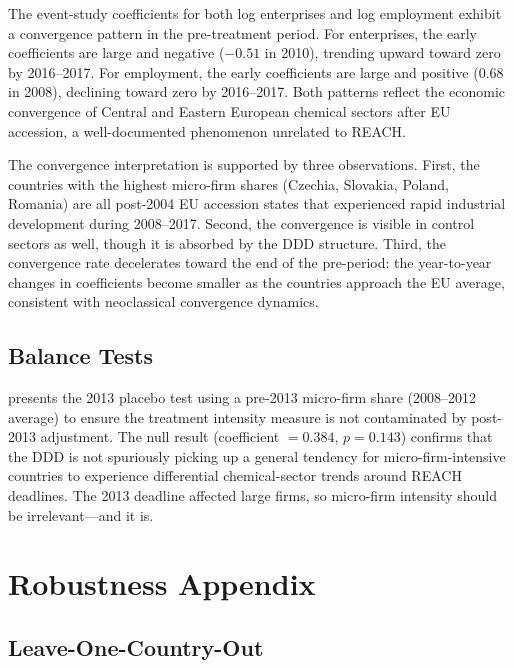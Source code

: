 \documentclass[12pt]{article}
\begin{document}
The event-study coefficients for both log enterprises and log employment exhibit a convergence pattern in the pre-treatment period. For enterprises, the early coefficients are large and negative ($-0.51$ in 2010), trending upward toward zero by 2016--2017. For employment, the early coefficients are large and positive ($0.68$ in 2008), declining toward zero by 2016--2017. Both patterns reflect the economic convergence of Central and Eastern European chemical sectors after EU accession, a well-documented phenomenon unrelated to REACH.

The convergence interpretation is supported by three observations. First, the countries with the highest micro-firm shares (Czechia, Slovakia, Poland, Romania) are all post-2004 EU accession states that experienced rapid industrial development during 2008--2017. Second, the convergence is visible in control sectors as well, though it is absorbed by the DDD structure. Third, the convergence rate decelerates toward the end of the pre-period: the year-to-year changes in coefficients become smaller as the countries approach the EU average, consistent with neoclassical convergence dynamics.

\subsection{Balance Tests}

 presents the 2013 placebo test using a pre-2013 micro-firm share (2008--2012 average) to ensure the treatment intensity measure is not contaminated by post-2013 adjustment. The null result (coefficient $= 0.384$, $p = 0.143$) confirms that the DDD is not spuriously picking up a general tendency for micro-firm-intensive countries to experience differential chemical-sector trends around REACH deadlines. The 2013 deadline affected large firms, so micro-firm intensity should be irrelevant---and it is.


\section{Robustness Appendix}
\label{sec:app_robust}

\subsection{Leave-One-Country-Out}
\end{document}
